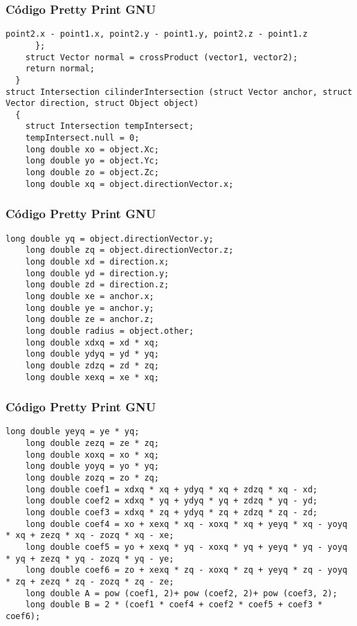 \documentclass{beamer}
\begin{document}
\begin{frame}[fragile]
\frametitle{C\'odigo Pretty Print GNU}
\begin{lstlisting}[style=CStyle]
        point2.x - point1.x, point2.y - point1.y, point2.z - point1.z
      };
    struct Vector normal = crossProduct (vector1, vector2);
    return normal;
  }
struct Intersection cilinderIntersection (struct Vector anchor, struct Vector direction, struct Object object)
  {
    struct Intersection tempIntersect;
    tempIntersect.null = 0;
    long double xo = object.Xc;
    long double yo = object.Yc;
    long double zo = object.Zc;
    long double xq = object.directionVector.x;
\end{lstlisting}
\end{frame}
\begin{frame}[fragile]
\frametitle{C\'odigo Pretty Print GNU}
\begin{lstlisting}[style=CStyle]
    long double yq = object.directionVector.y;
    long double zq = object.directionVector.z;
    long double xd = direction.x;
    long double yd = direction.y;
    long double zd = direction.z;
    long double xe = anchor.x;
    long double ye = anchor.y;
    long double ze = anchor.z;
    long double radius = object.other;
    long double xdxq = xd * xq;
    long double ydyq = yd * yq;
    long double zdzq = zd * zq;
    long double xexq = xe * xq;
\end{lstlisting}
\end{frame}
\begin{frame}[fragile]
\frametitle{C\'odigo Pretty Print GNU}
\begin{lstlisting}[style=CStyle]
    long double yeyq = ye * yq;
    long double zezq = ze * zq;
    long double xoxq = xo * xq;
    long double yoyq = yo * yq;
    long double zozq = zo * zq;
    long double coef1 = xdxq * xq + ydyq * xq + zdzq * xq - xd;
    long double coef2 = xdxq * yq + ydyq * yq + zdzq * yq - yd;
    long double coef3 = xdxq * zq + ydyq * zq + zdzq * zq - zd;
    long double coef4 = xo + xexq * xq - xoxq * xq + yeyq * xq - yoyq * xq + zezq * xq - zozq * xq - xe;
    long double coef5 = yo + xexq * yq - xoxq * yq + yeyq * yq - yoyq * yq + zezq * yq - zozq * yq - ye;
    long double coef6 = zo + xexq * zq - xoxq * zq + yeyq * zq - yoyq * zq + zezq * zq - zozq * zq - ze;
    long double A = pow (coef1, 2)+ pow (coef2, 2)+ pow (coef3, 2);
    long double B = 2 * (coef1 * coef4 + coef2 * coef5 + coef3 * coef6);
\end{lstlisting}
\end{frame}
\end{document}

